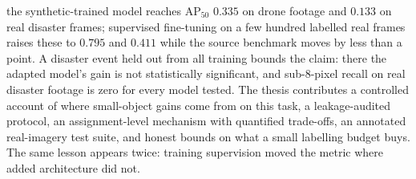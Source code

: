 the synthetic-trained model reaches $\mathrm{AP}_{50}$ $0.335$ on drone footage
and $0.133$ on real disaster frames; supervised fine-tuning on a few hundred
labelled real frames raises these to $0.795$ and $0.411$ while the source
benchmark moves by less than a point. A disaster event held out from all
training bounds the claim: there the adapted model's gain is not statistically
significant, and sub-8-pixel recall on real disaster footage is zero for every
model tested. The thesis contributes a controlled account of where small-object
gains come from on this task, a leakage-audited protocol, an assignment-level
mechanism with quantified trade-offs, an annotated real-imagery test suite, and
honest bounds on what a small labelling budget buys. The same lesson appears
twice: training supervision moved the metric where added architecture did not.
